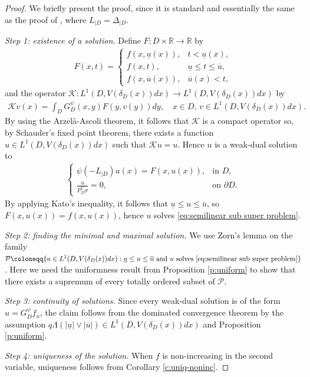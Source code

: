 \documentclass[12pt,a4paper,onecolumn]{article}
\theoremstyle{definition}
\newcommand{\R}{\mathbb{R}}
\newcommand{\1}{\mathbf 1}
\newcommand{\de}{\delta_D}
\newcommand{\LLL}{L^1(D,V(\de(x))dx)}
\newcommand{\KK}{\mathcal{K}}
\newcommand{\Lbase}{L_{|D}}
\newcommand{\Lo}{\psi(-L_{|D})}
\newcommand{\GDP}{G_D^\psi}
\newcommand{\PDS}{P^{\psi}_{ D}}
\numberwithin{equation}{section}
\begin{document}
 \begin{proof}
    We briefly present the proof, since it is standard and essentially the same as the proof of \cite[Theorem 5.9]{Bio23cpaa}, where $\Lbase=\Delta_{|D}$.
    
     \textit{Step 1: existence of a solution.} Define $F:D\times \R\to \R$ by 
     \begin{align*}
     	F(x,t)=\begin{cases}
     		f(x,\underline u(x)),&t<\underline u(x),\\
     		f(x,t),&\underline{u}\le t \le \overline u,\\
     		f(x,\overline u(x)),&\overline u(x)<t,
     	\end{cases}
     \end{align*}
     and the operator $\KK :\LLL\to \LLL$ by
     \begin{align*}
     	\KK v(x)=\int_D\GDP(x,y)F(y,v(y))dy,\quad x\in D,\, v\in \LLL.
     \end{align*}
     By using the Arzel\`{a}-Ascoli theorem, it follows that $\KK$ is a compact operator so, by Schauder's fixed point theorem, there exists a function $u\in \LLL$ such that $\KK u=u$. Hence $u$ is a weak-dual solution to
     \begin{align*}
     	\begin{cases}
     		\Lo u(x)=F(x,u(x)),&\textrm{in $D$},\\
     		\frac{u}{\PDS\sigma}=0,&\textrm{on $\partial D$}.
     	\end{cases}
     \end{align*}
     By applying Kato's inequality, it follows that $\underline u \le u \le \overline u$, so $F(x,u(x))=f(x,u(x))$, hence $u$ solves \eqref{eq:semilinear sub super problem}.
     
     \textit{Step 2: finding the minimal and maximal solution.} We use Zorn's lemma on the family  $\mathcal{P}\coloneqq\{u\in \LLL: \underline u\le u\le \overline u\text{ and $u$ solves \eqref{eq:semilinear sub super problem}}\}$. Here we need the  uniformness result from Proposition \ref{p:uniform} to show that there exists a supremum of every totally ordered subset of $\mathcal{P}$.
     
     \textit{Step 3: continuity of solutions.} Since every weak-dual solution is of the form $u=\GDP f_u$, the claim follows from the dominated convergence theorem by the assumption $q\Lambda(|\underline u|\vee |\overline u|)\in \LLL$ and Proposition \ref{p:uniform}.
     
     \textit{Step 4: uniqueness of the solution.} When $f$ is non-increasing in the second variable, uniqueness follows from Corollary \ref{c:uniq-noninc}.
\end{proof}
\end{document}
